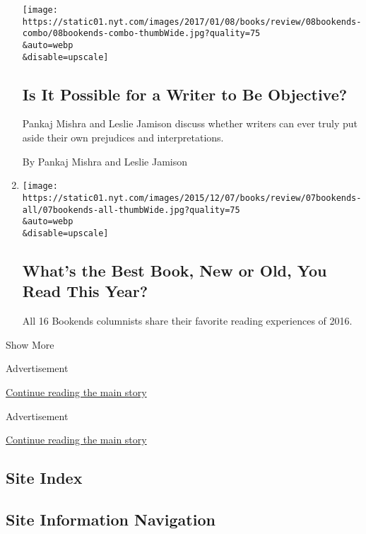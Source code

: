\begin{enumerate}
  \texttt{[image: https://static01.nyt.com/images/2017/01/08/books/review/08bookends-combo/08bookends-combo-thumbWide.jpg?quality=75\\\&auto=webp\\\&disable=upscale]}

  \hypertarget{is-it-possible-for-a-writer-to-be-objective}{%
  \subsection{Is It Possible for a Writer to Be
  Objective?}\label{is-it-possible-for-a-writer-to-be-objective}}

  Pankaj Mishra and Leslie Jamison discuss whether writers can ever
  truly put aside their own prejudices and interpretations.

  By Pankaj Mishra and Leslie Jamison
\item
  \href{/2016/12/21/books/review/whats-the-best-book-new-or-old-you-read-this-year.html}{}

  \texttt{[image: https://static01.nyt.com/images/2015/12/07/books/review/07bookends-all/07bookends-all-thumbWide.jpg?quality=75\\\&auto=webp\\\&disable=upscale]}

  \hypertarget{whats-the-best-book-new-or-old-you-read-this-year}{%
  \subsection{What's the Best Book, New or Old, You Read This
  Year?}\label{whats-the-best-book-new-or-old-you-read-this-year}}

  All 16 Bookends columnists share their favorite reading experiences of
  2016.
\end{enumerate}

Show More

Advertisement

\protect\hyperlink{after-mid1}{Continue reading the main story}

Advertisement

\protect\hyperlink{after-mktg}{Continue reading the main story}

\hypertarget{site-index}{%
\subsection{Site Index}\label{site-index}}

\hypertarget{site-information-navigation}{%
\subsection{Site Information
Navigation}\label{site-information-navigation}}

